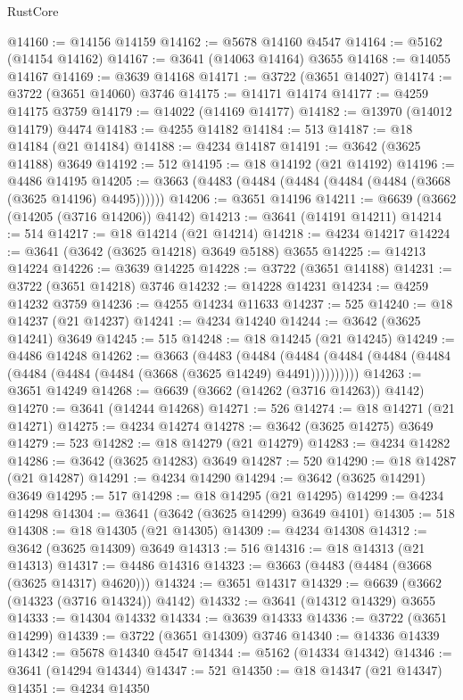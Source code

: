 \begin{lexlean}{RustCore}
\begin{coremodule}
@14160 := @14156 @14159
@14162 := @5678 @14160 @4547
@14164 := @5162 (@14154 @14162)
@14167 := @3641 (@14063 @14164) @3655
@14168 := @14055 @14167
@14169 := @3639 @14168
@14171 := @3722 (@3651 @14027)
@14174 := @3722 (@3651 @14060) @3746
@14175 := @14171 @14174
@14177 := @4259 @14175 @3759
@14179 := @14022 (@14169 @14177)
@14182 := @13970 (@14012 @14179) @4474
@14183 := @4255 @14182
@14184 := 513
@14187 := @18 @14184 (@21 @14184)
@14188 := @4234 @14187
@14191 := @3642 (@3625 @14188) @3649
@14192 := 512
@14195 := @18 @14192 (@21 @14192)
@14196 := @4486 @14195
@14205 := @3663 (@4483 (@4484 (@4484 (@4484 (@4484 (@3668 (@3625 @14196) @4495))))))
@14206 := @3651 @14196
@14211 := @6639 (@3662 (@14205 (@3716 @14206)) @4142)
@14213 := @3641 (@14191 @14211)
@14214 := 514
@14217 := @18 @14214 (@21 @14214)
@14218 := @4234 @14217
@14224 := @3641 (@3642 (@3625 @14218) @3649 @5188) @3655
@14225 := @14213 @14224
@14226 := @3639 @14225
@14228 := @3722 (@3651 @14188)
@14231 := @3722 (@3651 @14218) @3746
@14232 := @14228 @14231
@14234 := @4259 @14232 @3759
@14236 := @4255 @14234 @11633
@14237 := 525
@14240 := @18 @14237 (@21 @14237)
@14241 := @4234 @14240
@14244 := @3642 (@3625 @14241) @3649
@14245 := 515
@14248 := @18 @14245 (@21 @14245)
@14249 := @4486 @14248
@14262 := @3663
    (@4483
      (@4484 (@4484 (@4484 (@4484 (@4484 (@4484 (@4484 (@4484 (@3668 (@3625 @14249) @4491))))))))))
@14263 := @3651 @14249
@14268 := @6639 (@3662 (@14262 (@3716 @14263)) @4142)
@14270 := @3641 (@14244 @14268)
@14271 := 526
@14274 := @18 @14271 (@21 @14271)
@14275 := @4234 @14274
@14278 := @3642 (@3625 @14275) @3649
@14279 := 523
@14282 := @18 @14279 (@21 @14279)
@14283 := @4234 @14282
@14286 := @3642 (@3625 @14283) @3649
@14287 := 520
@14290 := @18 @14287 (@21 @14287)
@14291 := @4234 @14290
@14294 := @3642 (@3625 @14291) @3649
@14295 := 517
@14298 := @18 @14295 (@21 @14295)
@14299 := @4234 @14298
@14304 := @3641 (@3642 (@3625 @14299) @3649 @4101)
@14305 := 518
@14308 := @18 @14305 (@21 @14305)
@14309 := @4234 @14308
@14312 := @3642 (@3625 @14309) @3649
@14313 := 516
@14316 := @18 @14313 (@21 @14313)
@14317 := @4486 @14316
@14323 := @3663 (@4483 (@4484 (@3668 (@3625 @14317) @4620)))
@14324 := @3651 @14317
@14329 := @6639 (@3662 (@14323 (@3716 @14324)) @4142)
@14332 := @3641 (@14312 @14329) @3655
@14333 := @14304 @14332
@14334 := @3639 @14333
@14336 := @3722 (@3651 @14299)
@14339 := @3722 (@3651 @14309) @3746
@14340 := @14336 @14339
@14342 := @5678 @14340 @4547
@14344 := @5162 (@14334 @14342)
@14346 := @3641 (@14294 @14344)
@14347 := 521
@14350 := @18 @14347 (@21 @14347)
@14351 := @4234 @14350

\end{coremodule}
\end{lexlean}
